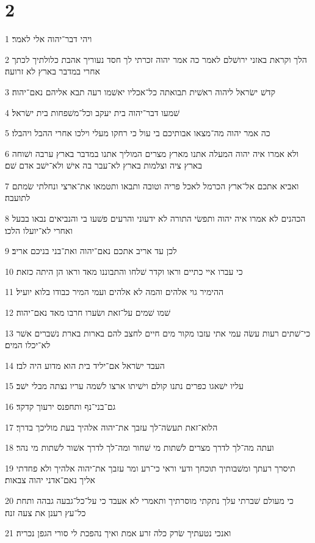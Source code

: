 \chapter{2}

\par 1 ויהי דבר־יהוה אלי לאמר׃
\par 2 הלך וקראת באזני ירושׁלם לאמר כה אמר יהוה זכרתי לך חסד נעוריך אהבת כלולתיך לכתך אחרי במדבר בארץ לא זרועה׃
\par 3 קדשׁ ישׂראל ליהוה ראשׁית תבואתה כל־אכליו יאשׁמו רעה תבא אליהם נאם־יהוה׃
\par 4 שׁמעו דבר־יהוה בית יעקב וכל־משׁפחות בית ישׂראל׃
\par 5 כה אמר יהוה מה־מצאו אבותיכם בי עול כי רחקו מעלי וילכו אחרי ההבל ויהבלו׃
\par 6 ולא אמרו איה יהוה המעלה אתנו מארץ מצרים המוליך אתנו במדבר בארץ ערבה ושׁוחה בארץ ציה וצלמות בארץ לא־עבר בה אישׁ ולא־ישׁב אדם שׁם׃
\par 7 ואביא אתכם אל־ארץ הכרמל לאכל פריה וטובה ותבאו ותטמאו את־ארצי ונחלתי שׂמתם לתועבה׃
\par 8 הכהנים לא אמרו איה יהוה ותפשׂי התורה לא ידעוני והרעים פשׁעו בי והנביאים נבאו בבעל ואחרי לא־יועלו הלכו׃
\par 9 לכן עד אריב אתכם נאם־יהוה ואת־בני בניכם אריב׃
\par 10 כי עברו איי כתיים וראו וקדר שׁלחו והתבוננו מאד וראו הן היתה כזאת׃
\par 11 ההימיר גוי אלהים והמה לא אלהים ועמי המיר כבודו בלוא יועיל׃
\par 12 שׁמו שׁמים על־זאת ושׂערו חרבו מאד נאם־יהוה׃
\par 13 כי־שׁתים רעות עשׂה עמי אתי עזבו מקור מים חיים לחצב להם בארות בארת נשׁברים אשׁר לא־יכלו המים׃
\par 14 העבד ישׂראל אם־יליד בית הוא מדוע היה לבז׃
\par 15 עליו ישׁאגו כפרים נתנו קולם וישׁיתו ארצו לשׁמה עריו נצתה מבלי ישׁב׃
\par 16 גם־בני־נף ותחפנס ירעוך קדקד׃
\par 17 הלוא־זאת תעשׂה־לך עזבך את־יהוה אלהיך בעת מוליכך בדרך׃
\par 18 ועתה מה־לך לדרך מצרים לשׁתות מי שׁחור ומה־לך לדרך אשׁור לשׁתות מי נהר׃
\par 19 תיסרך רעתך ומשׁבותיך תוכחך ודעי וראי כי־רע ומר עזבך את־יהוה אלהיך ולא פחדתי אליך נאם־אדני יהוה צבאות׃
\par 20 כי מעולם שׁברתי עלך נתקתי מוסרתיך ותאמרי לא אעבד כי על־כל־גבעה גבהה ותחת כל־עץ רענן את צעה זנה׃
\par 21 ואנכי נטעתיך שׂרק כלה זרע אמת ואיך נהפכת לי סורי הגפן נכריה׃
